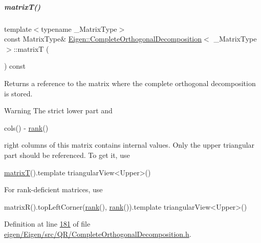 \mbox{\label{group___q_r___module_a806213f5c96ff765265f47067229586d}} 
\subparagraph{\texorpdfstring{matrix\+T()}{matrixT()}\hspace{0.1cm}{\footnotesize\ttfamily [2/2]}}
{\footnotesize\ttfamily template$<$typename \+\_\+\+Matrix\+Type$>$ \\
const Matrix\+Type\& \hyperlink{group___q_r___module_class_eigen_1_1_complete_orthogonal_decomposition}{Eigen\+::\+Complete\+Orthogonal\+Decomposition}$<$ \+\_\+\+Matrix\+Type $>$\+::matrixT (\begin{DoxyParamCaption}{ }\end{DoxyParamCaption}) const\hspace{0.3cm}{\ttfamily [inline]}}

\begin{DoxyReturn}{Returns}
a reference to the matrix where the complete orthogonal decomposition is stored. 
\end{DoxyReturn}
\begin{DoxyWarning}{Warning}
The strict lower part and
\begin{DoxyCode}
cols() - \hyperlink{group___q_r___module_af348f64b26f8467a020062c22b748806}{rank}() 
\end{DoxyCode}
 right columns of this matrix contains internal values. Only the upper triangular part should be referenced. To get it, use 
\begin{DoxyCode}
\hyperlink{group___q_r___module_a806213f5c96ff765265f47067229586d}{matrixT}().template triangularView<Upper>() 
\end{DoxyCode}
 For rank-\/deficient matrices, use 
\begin{DoxyCode}
matrixR().topLeftCorner(\hyperlink{group___q_r___module_af348f64b26f8467a020062c22b748806}{rank}(), \hyperlink{group___q_r___module_af348f64b26f8467a020062c22b748806}{rank}()).template triangularView<Upper>()
\end{DoxyCode}
 
\end{DoxyWarning}


Definition at line \hyperlink{eigen_2_eigen_2src_2_q_r_2_complete_orthogonal_decomposition_8h_source_l00181}{181} of file \hyperlink{eigen_2_eigen_2src_2_q_r_2_complete_orthogonal_decomposition_8h_source}{eigen/\+Eigen/src/\+Q\+R/\+Complete\+Orthogonal\+Decomposition.\+h}.

